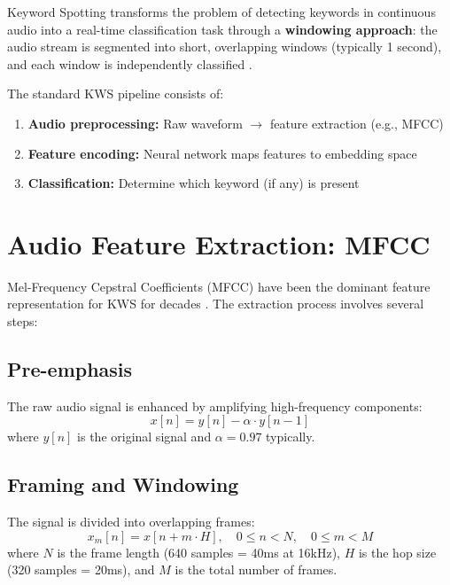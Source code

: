 \documentclass[12pt,a4paper]{report}
\begin{document}
Keyword Spotting transforms the problem of detecting keywords in continuous
audio into a real-time classification task through a \textbf{windowing
approach}: the audio stream is segmented into short, overlapping windows
(typically 1 second), and each window is independently classified
\cite{lopez2021deep}.

The standard KWS pipeline consists of:
\begin{enumerate}
    \item \textbf{Audio preprocessing:} Raw waveform $\rightarrow$ feature
          extraction (e.g., MFCC)
    \item \textbf{Feature encoding:} Neural network maps features to
          embedding space
    \item \textbf{Classification:} Determine which keyword (if any) is
          present
\end{enumerate}

\section{Audio Feature Extraction: MFCC}
\label{sec:mfcc}

Mel-Frequency Cepstral Coefficients (MFCC) have been the dominant feature
representation for KWS for decades \cite{lopez2021deep}. The extraction
process involves several steps:

\subsection{Pre-emphasis}

The raw audio signal is enhanced by amplifying high-frequency components:
\begin{equation}
    x[n] = y[n] - \alpha \cdot y[n-1]
    \label{eq:preemphasis}
\end{equation}
where $y[n]$ is the original signal and $\alpha = 0.97$ typically.

\subsection{Framing and Windowing}

The signal is divided into overlapping frames:
\begin{equation}
    x_m[n] = x[n + m \cdot H], \quad 0 \leq n < N, \quad 0 \leq m < M
\end{equation}
where $N$ is the frame length (640 samples = 40ms at 16kHz), $H$ is the hop
size (320 samples = 20ms), and $M$ is the total number of frames.
\end{document}
